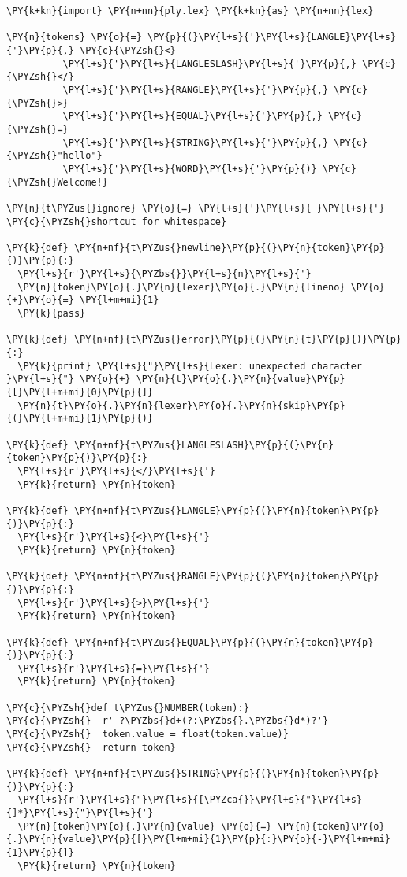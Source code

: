 \begin{Verbatim}[commandchars=\\\{\}]
\PY{k+kn}{import} \PY{n+nn}{ply.lex} \PY{k+kn}{as} \PY{n+nn}{lex}

\PY{n}{tokens} \PY{o}{=} \PY{p}{(}\PY{l+s}{'}\PY{l+s}{LANGLE}\PY{l+s}{'}\PY{p}{,} \PY{c}{\PYZsh{}<}
          \PY{l+s}{'}\PY{l+s}{LANGLESLASH}\PY{l+s}{'}\PY{p}{,} \PY{c}{\PYZsh{}</}
          \PY{l+s}{'}\PY{l+s}{RANGLE}\PY{l+s}{'}\PY{p}{,} \PY{c}{\PYZsh{}>}
          \PY{l+s}{'}\PY{l+s}{EQUAL}\PY{l+s}{'}\PY{p}{,} \PY{c}{\PYZsh{}=}
          \PY{l+s}{'}\PY{l+s}{STRING}\PY{l+s}{'}\PY{p}{,} \PY{c}{\PYZsh{}"hello"}
          \PY{l+s}{'}\PY{l+s}{WORD}\PY{l+s}{'}\PY{p}{)} \PY{c}{\PYZsh{}Welcome!}

\PY{n}{t\PYZus{}ignore} \PY{o}{=} \PY{l+s}{'}\PY{l+s}{ }\PY{l+s}{'} \PY{c}{\PYZsh{}shortcut for whitespace}

\PY{k}{def} \PY{n+nf}{t\PYZus{}newline}\PY{p}{(}\PY{n}{token}\PY{p}{)}\PY{p}{:}
  \PY{l+s}{r'}\PY{l+s}{\PYZbs{}}\PY{l+s}{n}\PY{l+s}{'}
  \PY{n}{token}\PY{o}{.}\PY{n}{lexer}\PY{o}{.}\PY{n}{lineno} \PY{o}{+}\PY{o}{=} \PY{l+m+mi}{1}
  \PY{k}{pass}

\PY{k}{def} \PY{n+nf}{t\PYZus{}error}\PY{p}{(}\PY{n}{t}\PY{p}{)}\PY{p}{:}
  \PY{k}{print} \PY{l+s}{"}\PY{l+s}{Lexer: unexpected character }\PY{l+s}{"} \PY{o}{+} \PY{n}{t}\PY{o}{.}\PY{n}{value}\PY{p}{[}\PY{l+m+mi}{0}\PY{p}{]}
  \PY{n}{t}\PY{o}{.}\PY{n}{lexer}\PY{o}{.}\PY{n}{skip}\PY{p}{(}\PY{l+m+mi}{1}\PY{p}{)}

\PY{k}{def} \PY{n+nf}{t\PYZus{}LANGLESLASH}\PY{p}{(}\PY{n}{token}\PY{p}{)}\PY{p}{:}
  \PY{l+s}{r'}\PY{l+s}{</}\PY{l+s}{'}
  \PY{k}{return} \PY{n}{token}

\PY{k}{def} \PY{n+nf}{t\PYZus{}LANGLE}\PY{p}{(}\PY{n}{token}\PY{p}{)}\PY{p}{:}
  \PY{l+s}{r'}\PY{l+s}{<}\PY{l+s}{'}
  \PY{k}{return} \PY{n}{token}

\PY{k}{def} \PY{n+nf}{t\PYZus{}RANGLE}\PY{p}{(}\PY{n}{token}\PY{p}{)}\PY{p}{:}
  \PY{l+s}{r'}\PY{l+s}{>}\PY{l+s}{'}
  \PY{k}{return} \PY{n}{token}

\PY{k}{def} \PY{n+nf}{t\PYZus{}EQUAL}\PY{p}{(}\PY{n}{token}\PY{p}{)}\PY{p}{:}
  \PY{l+s}{r'}\PY{l+s}{=}\PY{l+s}{'}
  \PY{k}{return} \PY{n}{token}

\PY{c}{\PYZsh{}def t\PYZus{}NUMBER(token):}
\PY{c}{\PYZsh{}  r'-?\PYZbs{}d+(?:\PYZbs{}.\PYZbs{}d*)?'}
\PY{c}{\PYZsh{}  token.value = float(token.value)}
\PY{c}{\PYZsh{}  return token}

\PY{k}{def} \PY{n+nf}{t\PYZus{}STRING}\PY{p}{(}\PY{n}{token}\PY{p}{)}\PY{p}{:}
  \PY{l+s}{r'}\PY{l+s}{"}\PY{l+s}{[\PYZca{}}\PY{l+s}{"}\PY{l+s}{]*}\PY{l+s}{"}\PY{l+s}{'}
  \PY{n}{token}\PY{o}{.}\PY{n}{value} \PY{o}{=} \PY{n}{token}\PY{o}{.}\PY{n}{value}\PY{p}{[}\PY{l+m+mi}{1}\PY{p}{:}\PY{o}{-}\PY{l+m+mi}{1}\PY{p}{]}
  \PY{k}{return} \PY{n}{token}


\end{Verbatim}
